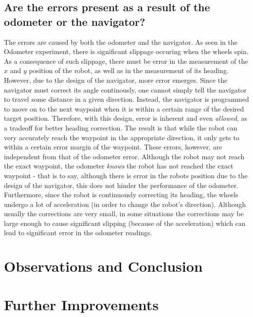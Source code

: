 \documentclass[11pt]{article}
\begin{document}
\subsection{Are the errors present as a result of the odometer or the navigator?}
The errors are caused by both the odometer and the navigator. As seen in the Odometer experiment, there
is significant slippage occuring when the wheels spin. As a consequence of such slippage, there must
be error in the measurement of the $x$ and $y$ position of the robot, as well as in the measurement
of its heading. \\
However, due to the design of the navigator, more error emerges. Since the navigator
must correct its angle continously, one cannot simply tell the navigator to travel some distance in
a given direction. Instead, the navigator is programmed to move on to the next waypoint when it is
within a certain range of the desired target position. Therefore, with this design, error is
inherent and even \textit{allowed}, as a tradeoff for better heading correction. The result is that
while the robot can very accurately reach the waypoint in the appropriate direction, it only gets
to within a certain error margin of the waypoint. These errors, however, are independent from that of
the odometer error. Although the robot may not reach the exact waypoint, the odometer \textit{knows}
the robot has not reached the exact waypoint - that is to say, although there is error in the robots
position due to the design of the navigator, this does not hinder the performance of the odometer.
\\
Furthermore, since the robot is continuously correcting its heading, the wheels undergo a lot of
acceleration (in order to change the robot's direction). Although usually the corrections are very
small, in some situations the corrections may be large enough to cause significant slipping (because
of the acceleration) which can lead to significant error in the odometer readings.

\section{Observations and Conclusion}
\section{Further Improvements}
\end{document}
